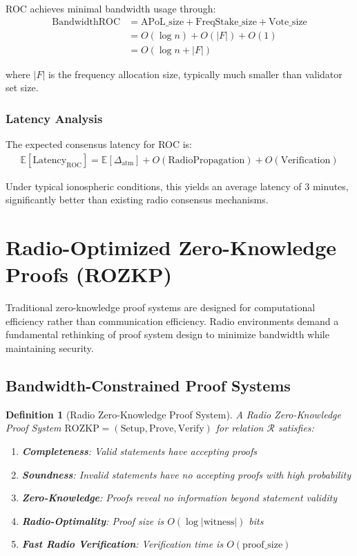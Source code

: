 \documentclass[11pt,a4paper]{article}
\newtheorem{definition}[theorem]{Definition}
\begin{document}
ROC achieves minimal bandwidth usage through:
\begin{align}
\text{BandwidthROC} &= \text{APoL\_size} + \text{FreqStake\_size} + \text{Vote\_size}\\
&= O(\log n) + O(|F|) + O(1)\\
&= O(\log n + |F|)
\end{align}

where $|F|$ is the frequency allocation size, typically much smaller than validator set size.

\subsubsection{Latency Analysis}

The expected consensus latency for ROC is:
\begin{align}
\mathbb{E}[\text{Latency}_{\text{ROC}}] = \mathbb{E}[\Delta_{\text{atm}}] + O(\text{RadioPropagation}) + O(\text{Verification})
\end{align}

Under typical ionospheric conditions, this yields an average latency of 3 minutes, significantly better than existing radio consensus mechanisms.

\section{Radio-Optimized Zero-Knowledge Proofs (ROZKP)}

Traditional zero-knowledge proof systems are designed for computational efficiency rather than communication efficiency. Radio environments demand a fundamental rethinking of proof system design to minimize bandwidth while maintaining security.

\subsection{Bandwidth-Constrained Proof Systems}

\begin{definition}[Radio Zero-Knowledge Proof System]
A Radio Zero-Knowledge Proof System $\text{ROZKP} = (\text{Setup}, \text{Prove}, \text{Verify})$ for relation $\mathcal{R}$ satisfies:
\begin{enumerate}
\item \textbf{Completeness}: Valid statements have accepting proofs
\item \textbf{Soundness}: Invalid statements have no accepting proofs with high probability
\item \textbf{Zero-Knowledge}: Proofs reveal no information beyond statement validity
\item \textbf{Radio-Optimality}: Proof size is $O(\log |\text{witness}|)$ bits
\item \textbf{Fast Radio Verification}: Verification time is $O(\text{proof\_size})$
\end{enumerate}
\end{definition}
\end{document}
